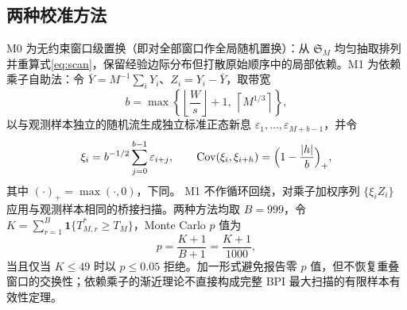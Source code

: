 \subsection{两种校准方法}\label{sec:calibration}
M0 为无约束窗口级置换（即对全部窗口作全局随机置换）：从 $\mathfrak S_M$ 均匀抽取排列并重算式\eqref{eq:scan}，保留经验边际分布但打散原始顺序中的局部依赖。M1 为依赖乘子自助法：令 $\bar Y=M^{-1}\sum_iY_i$、$Z_i=Y_i-\bar Y$，取带宽
\begin{equation}\label{eq:dmb-bandwidth}
 b=\max\left\{\left\lfloor\frac Ws\right\rfloor+1,\ \left\lceil M^{1/3}\right\rceil\right\},
\end{equation}
以与观测样本独立的随机流生成独立标准正态新息 $\varepsilon_1,\ldots,\varepsilon_{M+b-1}$，并令
\begin{equation}\label{eq:dmb-multiplier}
 \xi_i=b^{-1/2}\sum_{j=0}^{b-1}\varepsilon_{i+j},
 \qquad
 \operatorname{Cov}(\xi_i,\xi_{i+h})=\Bigl(1-\frac{|h|}{b}\Bigr)_+ ,
\end{equation}
其中 $(\cdot)_+=\max(\cdot,0)$，下同。
M1 不作循环回绕，对乘子加权序列 $\{\xi_iZ_i\}$ 应用与观测样本相同的桥接扫描。两种方法均取 $B=999$，令 $K=\sum_{r=1}^{B}\mathbf 1\{T_{M,r}^{*}\ge T_M\}$，Monte Carlo $p$ 值为
\begin{equation}\label{eq:mc-pvalue}
 p=\frac{K+1}{B+1}=\frac{K+1}{1000},
\end{equation}
当且仅当 $K\le49$ 时以 $p\le0.05$ 拒绝。加一形式避免报告零 $p$ 值\cite{PhipsonSmyth2010}，但不恢复重叠窗口的交换性；依赖乘子的渐近理论不直接构成完整 BPI 最大扫描的有限样本有效性定理。
